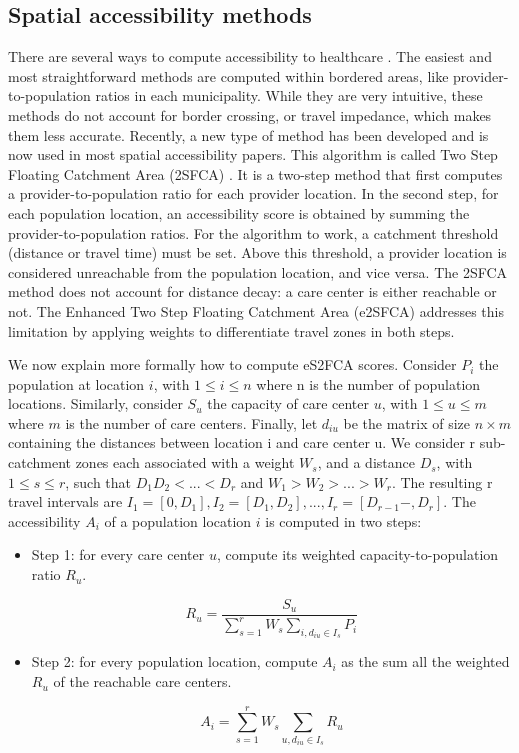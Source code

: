 \subsection{Spatial accessibility methods}

There are several ways to compute accessibility to healthcare \cite{guagliardo_spatial_2004}. The easiest and most straightforward methods are computed within bordered areas, like provider-to-population ratios in each municipality. While they are very intuitive, these methods do not account for border crossing, or travel impedance, which makes them less accurate. Recently, a new type of method has been developed and is now used in most spatial accessibility papers. This algorithm is called Two Step Floating Catchment Area (2SFCA) \cite{luo_using_2004}. It is a two-step method that first computes a provider-to-population ratio for each provider location. In the second step, for each population location, an accessibility score is obtained by summing the provider-to-population ratios. For the algorithm to work, a catchment threshold (distance or travel time) must be set. Above this threshold, a provider location is considered unreachable from the population location, and vice versa. The 2SFCA method does not account for distance decay: a care center is either reachable or not. The Enhanced Two Step Floating Catchment Area (e2SFCA) \cite{luo_enhanced_2009} addresses this limitation by applying weights to differentiate travel zones in both steps.

We now explain more formally how to compute eS2FCA scores. Consider $P_i$ the population at location $i$, with $1 \leq i \leq n$ where n is the number of population locations. Similarly, consider $S_u$ the capacity of care center $u$, with $1 \leq u \leq m$ where $m$ is the number of care centers. Finally, let $d_{iu}$ be the matrix of size $n \times m$ containing the distances between location i and care center u. We consider r sub-catchment zones each associated with a weight $W_s$, and a distance $D_s$, with $1 \leq s \leq r$, such that $D_1 D_2 < ... < D_r$ and $W_1 > W_2 > ... > W_r$. The resulting r travel intervals are $I_1=[0, D_1], I_2=[D_1, D_2 ], ... ,I_r=[D_{r-1}-,D_r]$. The accessibility $A_i$ of a population location $i$ is computed in two steps:

\begin{itemize}
    \item Step 1: for every care center $u$, compute its weighted capacity-to-population ratio $R_u$.

    \begin{equation}
    R_u =  \frac{S_u}{\sum_{s=1}^{r} W_s \sum_{i, d_{iu} \in I_s} P_i}
    \end{equation}

    \item Step 2: for every population location, compute $A_i$ as the sum all the weighted $R_u$ of the reachable care centers.

    \begin{equation}
    A_i = \sum_{s=1}^{r} W_s \sum_{u, d_{iu} \in I_s} R_u
    \end{equation}
\end{itemize}

